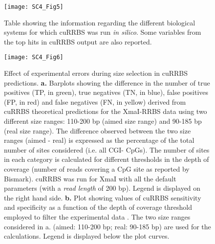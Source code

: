 \begin{figure}[htbp!] 
	\centering    
	\texttt{[image: SC4\_Fig5]}
	\caption[Additional results of running cuRRBS in different biological systems]{Table showing the information regarding the different biological systems \citep{Horvath2013,Hanna2016,Milagre2017,Kawakatsu2016,Maurano2015,LevMaor2015,Domcke2015} for which cuRRBS was run \textit{in silico}. Some variables from the top hits in cuRRBS output are also reported.}
	\label{fig:sc4_fig5}
\end{figure}

\begin{figure}[htbp!] 
	\centering    
	\texttt{[image: SC4\_Fig6]}
	\vspace*{2mm}
	\caption[Effect of experimental errors during size selection in cuRRBS predictions]{Effect of experimental errors during size selection in cuRRBS predictions. \textbf{a.} Barplots showing the difference in the number of true positives (TP, in green), true negatives (TN, in blue), false positives (FP, in red) and false negatives (FN, in yellow) derived from cuRRBS theoretical predictions for the XmaI-RRBS data \citep{Tanas2017} using two different size ranges: 110-200 bp (aimed size range) and 90-185 bp (real size range). The difference observed between the two size ranges (aimed - real) is expressed as the percentage of the total number of sites considered (i.e. all CGI- CpGs). The number of sites in each category is calculated for different thresholds in the depth of coverage (number of reads covering a CpG site as reported by Bismark). cuRRBS was run for XmaI with all the default parameters (with a \textit{read length} of 200 bp). Legend is displayed on the right hand side. \textbf{b.} Plot showing values of cuRRBS sensitivity and specificity as a function of the depth of coverage threshold employed to filter the experimental data \citep{Tanas2017}. The two size ranges considered in a. (aimed: 110-200 bp; real: 90-185 bp) are used for the calculations. Legend is displayed below the plot curves.}
	\label{fig:sc4_fig6}
\end{figure}

